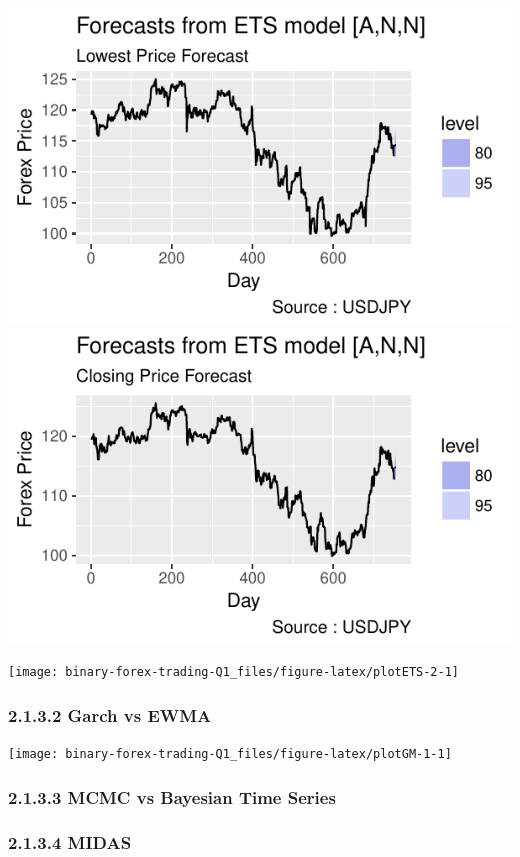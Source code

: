 \documentclass[]{tufte-book}
\begin{document}
\includegraphics{binary-forex-trading-Q1_files/figure-latex/plotETS-1-4}
\includegraphics{binary-forex-trading-Q1_files/figure-latex/plotETS-1-5}

\texttt{[image: binary-forex-trading-Q1\_files/figure-latex/plotETS-2-1]}

\subsubsection{2.1.3.2 Garch vs EWMA}\label{garch-vs-ewma-1}

\texttt{[image: binary-forex-trading-Q1\_files/figure-latex/plotGM-1-1]}

\subsubsection{2.1.3.3 MCMC vs Bayesian Time
Series}\label{mcmc-vs-bayesian-time-series-1}

\subsubsection{2.1.3.4 MIDAS}\label{midas-1}
\end{document}
